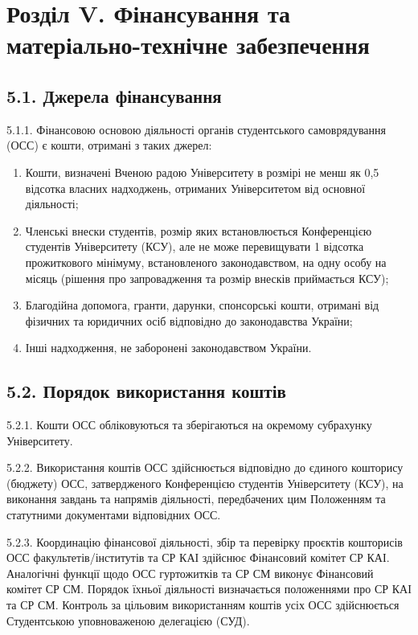 \section*{Розділ V. Фінансування та матеріально-технічне забезпечення}

\subsection*{5.1. Джерела фінансування}
    5.1.1. Фінансовою основою діяльності органів студентського самоврядування (ОСС) є кошти, отримані з таких джерел:

        \begin{enumerate}[label=\alph*)]
            \item Кошти, визначені Вченою радою Університету в розмірі не менш як 0,5 відсотка власних надходжень, отриманих Університетом від основної діяльності;
            \item Членські внески студентів, розмір яких встановлюється Конференцією студентів Університету (КСУ), але не може перевищувати 1 відсотка прожиткового мінімуму, встановленого законодавством, на одну особу на місяць (рішення про запровадження та розмір внесків приймається КСУ);
            \item Благодійна допомога, гранти, дарунки, спонсорські кошти, отримані від фізичних та юридичних осіб відповідно до законодавства України;
            \item Інші надходження, не заборонені законодавством України.
        \end{enumerate}

\subsection*{5.2. Порядок використання коштів}
    5.2.1. Кошти ОСС обліковуються та зберігаються на окремому субрахунку Університету.

    5.2.2. Використання коштів ОСС здійснюється відповідно до єдиного кошторису (бюджету) ОСС, затвердженого Конференцією студентів Університету (КСУ), на виконання завдань та напрямів діяльності, передбачених цим Положенням та статутними документами відповідних ОСС.

    5.2.3. Координацію фінансової діяльності, збір та перевірку проєктів кошторисів ОСС факультетів/інститутів та СР КАІ здійснює Фінансовий комітет СР КАІ. Аналогічні функції щодо ОСС гуртожитків та СР СМ виконує Фінансовий комітет СР СМ. Порядок їхньої діяльності визначається положеннями про СР КАІ та СР СМ. Контроль за цільовим використанням коштів усіх ОСС здійснюється Студентською уповноваженою делегацією (СУД).

